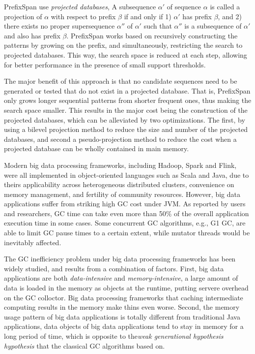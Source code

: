 \documentclass[sigplan, screen]{acmart}
\begin{document}
PrefixSpan use \emph{projected databases}, A subsequence
$\alpha'$ of sequence $\alpha$ is called a projection of $\alpha$ with respect to prefix $\beta$ if and only
if 1) $\alpha'$ has prefix $\beta$, and 2) there exists no proper supersequence $\alpha''$ of $\alpha'$ such that
$\alpha''$ is a subsequence of $\alpha'$ and also has prefix $\beta$. PrefixSpan works based
on recursively constructing the patterns by growing on the prefix, and simultaneously,
restricting the search to projected databases. This way, the search space is reduced at
each step, allowing for better performance in the presence of small support thresholds.

The major benefit of this approach is that no candidate sequences need to be generated or tested that do not exist in a projected database. That is, PrefixSpan only
grows longer sequential patterns from shorter frequent ones, thus making the search
space smaller. This results in the major cost being the construction of the projected
databases, which can be alleviated by two optimizations. The first, by using a bilevel
projection method to reduce the size and number of the projected databases, and second
a pseudo-projection method to reduce the cost when a projected database can be wholly
contained in main memory.


Modern big data processing frameworks, including Hadoop, Spark\cite{zaharia2010spark} and
Flink\cite{carbone2015apache}, were all implemented in object-oriented languages such as Scala and Java, due to 
theirs applicability across heterogeneous distributed clusters, convenience on memory management, and fertility 
of community resources. However, big data applications suffer from striking high GC cost under JVM. As reported by users and researchers,
GC time can take even more than 50$\%$ of the overall application execution time in some cases\cite{stackoverflow, bu2013bloat}.
Some concurrent GC algorithms, e.g., G1 GC\cite{detlefs2004garbage}, are able to limit GC pause times to a certain extent, 
while mutator threads would be inevitably affected\cite{xu2019experimental, wu2020platinum}.

The GC inefficiency problem under big data processing frameworks has been widely studied\cite{xu2019experimental,bruno2018study,gidra2013study}, 
and results from a combination of factors. First, big data applications are both \emph{data-intensive} and \emph{memory-intensive}, a large amount of data 
is loaded in the memory as objects at the runtime, putting servere overhead on the GC colloctor. Big data processing frameworks that caching intermediate 
computing results in the memory make thins even worse.
 Second, the memory usage pattern of big data applications is totally different from traditional Java applications, data objects of big data applications tend to stay in memory
 for a long period of time, which is opposite to the\emph{weak generational hypothesis hypothesis}\cite{weakgenerational} that the classical GC algorithms based on.
 
\end{document}
